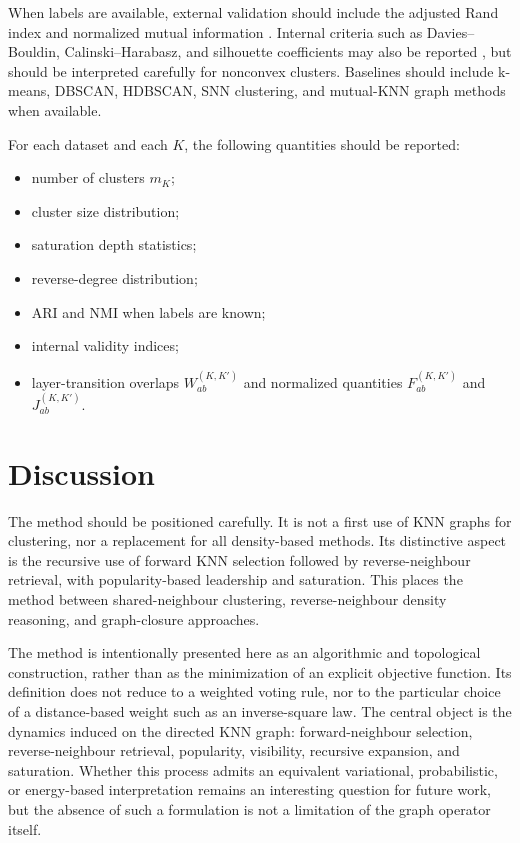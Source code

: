 \documentclass[pdflatex,sn-mathphys-num]{sn-jnl}
\begin{document}
When labels are available, external validation should include the adjusted Rand index and normalized mutual information \citep{HubertArabie1985,VinhEppsBailey2010}. Internal criteria such as Davies--Bouldin, Calinski--Harabasz, and silhouette coefficients may also be reported \citep{DaviesBouldin1979,CalinskiHarabasz1974,Rousseeuw1987}, but should be interpreted carefully for nonconvex clusters. Baselines should include k-means, DBSCAN, HDBSCAN, SNN clustering, and mutual-KNN graph methods when available.

For each dataset and each $K$, the following quantities should be reported:
\begin{itemize}
    \item number of clusters $m_K$;
    \item cluster size distribution;
    \item saturation depth statistics;
    \item reverse-degree distribution;
    \item ARI and NMI when labels are known;
    \item internal validity indices;
    \item layer-transition overlaps $W_{ab}^{(K,K')}$ and normalized quantities $F_{ab}^{(K,K')}$ and $J_{ab}^{(K,K')}$.
\end{itemize}

\section{Discussion}\label{sec:discussion}

The method should be positioned carefully. It is not a first use of KNN graphs for clustering, nor a replacement for all density-based methods. Its distinctive aspect is the recursive use of forward KNN selection followed by reverse-neighbour retrieval, with popularity-based leadership and saturation. This places the method between shared-neighbour clustering, reverse-neighbour density reasoning, and graph-closure approaches.

The method is intentionally presented here as an algorithmic and topological construction, rather than as the minimization of an explicit objective function. Its definition does not reduce to a weighted voting rule, nor to the particular choice of a distance-based weight such as an inverse-square law. The central object is the dynamics induced on the directed KNN graph: forward-neighbour selection, reverse-neighbour retrieval, popularity, visibility, recursive expansion, and saturation. Whether this process admits an equivalent variational, probabilistic, or energy-based interpretation remains an interesting question for future work, but the absence of such a formulation is not a limitation of the graph operator itself.
\end{document}
